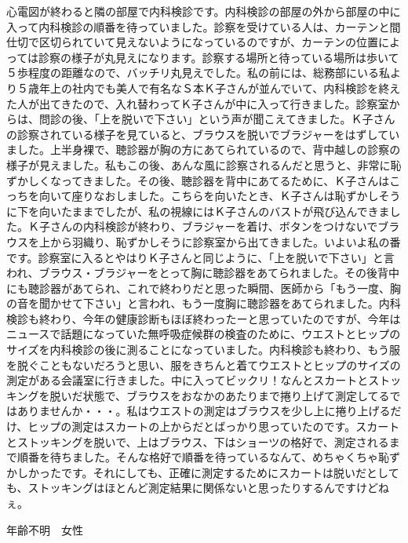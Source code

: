 心電図が終わると隣の部屋で内科検診です。内科検診の部屋の外から部屋の中に入って内科検診の順番を待っていました。診察を受けている人は、カーテンと間仕切で区切られていて見えないようになっているのですが、カーテンの位置によっては診察の様子が丸見えになります。診察する場所と待っている場所は歩いて５歩程度の距離なので、バッチリ丸見えでした。私の前には、総務部にいる私より５歳年上の社内でも美人で有名なＳ本Ｋ子さんが並んでいて、内科検診を終えた人が出てきたので、入れ替わってＫ子さんが中に入って行きました。診察室からは、問診の後、「上を脱いで下さい」という声が聞こえてきました。Ｋ子さんの診察されている様子を見ていると、ブラウスを脱いでブラジャーをはずしていました。上半身裸で、聴診器が胸の方にあてられているので、背中越しの診察の様子が見えました。私もこの後、あんな風に診察されるんだと思うと、非常に恥ずかしくなってきました。その後、聴診器を背中にあてるために、Ｋ子さんはこっちを向いて座りなおしました。こちらを向いたとき、Ｋ子さんは恥ずかしそうに下を向いたままでしたが、私の視線にはＫ子さんのバストが飛び込んできました。Ｋ子さんの内科検診が終わり、ブラジャーを着け、ボタンをつけないでブラウスを上から羽織り、恥ずかしそうに診察室から出てきました。いよいよ私の番です。診察室に入るとやはりＫ子さんと同じように、「上を脱いで下さい」と言われ、ブラウス・ブラジャーをとって胸に聴診器をあてられました。その後背中にも聴診器があてられ、これで終わりだと思った瞬間、医師から「もう一度、胸の音を聞かせて下さい」と言われ、もう一度胸に聴診器をあてられました。内科検診も終わり、今年の健康診断もほぼ終わったーと思っていたのですが、今年はニュースで話題になっていた無呼吸症候群の検査のために、ウエストとヒップのサイズを内科検診の後に測ることになっていました。内科検診も終わり、もう服を脱ぐこともないだろうと思い、服をきちんと着てウエストとヒップのサイズの測定がある会議室に行きました。中に入ってビックリ！なんとスカートとストッキングを脱いだ状態で、ブラウスをおなかのあたりまで捲り上げて測定してるではありませんか・・・。私はウエストの測定はブラウスを少し上に捲り上げるだけ、ヒップの測定はスカートの上からだとばっかり思っていたのです。スカートとストッキングを脱いで、上はブラウス、下はショーツの格好で、測定されるまで順番を待ちました。そんな格好で順番を待っているなんて、めちゃくちゃ恥ずかしかったです。それにしても、正確に測定するためにスカートは脱いだとしても、ストッキングはほとんど測定結果に関係ないと思ったりするんですけどねぇ。


年齢不明　女性

